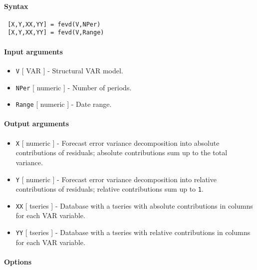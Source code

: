 


	\paragraph{Syntax}
 
 \begin{verbatim}
 [X,Y,XX,YY] = fevd(V,NPer)
 [X,Y,XX,YY] = fevd(V,Range)
 \end{verbatim}
 
 \paragraph{Input arguments}
 
 \begin{itemize}
 \item
   \texttt{V} {[} VAR {]} - Structural VAR model.
 \item
   \texttt{NPer} {[} numeric {]} - Number of periods.
 \item
   \texttt{Range} {[} numeric {]} - Date range.
 \end{itemize}
 
 \paragraph{Output arguments}
 
 \begin{itemize}
 \item
   \texttt{X} {[} numeric {]} - Forecast error variance decomposition
   into absolute contributions of residuals; absolute contributions sum
   up to the total variance.
 \item
   \texttt{Y} {[} numeric {]} - Forecast error variance decomposition
   into relative contributions of residuals; relative contributions sum
   up to \texttt{1}.
 \item
   \texttt{XX} {[} tseries {]} - Database with a tseries with absolute
   contributions in columns for each VAR variable.
 \item
   \texttt{YY} {[} tseries {]} - Database with a tseries with relative
   contributions in columns for each VAR variable.
 \end{itemize}
 
 \paragraph{Options}
 
